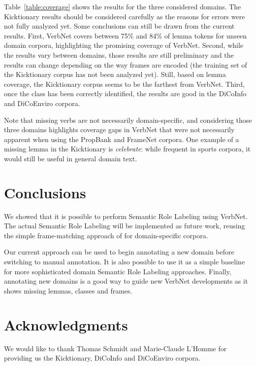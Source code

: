 Table~\ref{table:coverage} shows the results for the three considered domains.
The Kicktionary results should be considered carefully as the reasons for
errors were not fully analyzed yet. Some conclusions can still be drawn from
the current results. First, VerbNet covers between 75\% and 84\% of lemma
tokens for unseen domain corpora, highlighting the promising coverage of
VerbNet.  Second, while the results vary between domains, those results are
still preliminary and the results can change depending on the way frames are
encoded (the training set of the Kicktionary corpus has not been analyzed yet).
Still, based on lemma coverage, the Kicktionary corpus seems to be the farthest
from VerbNet. Third, once the class has been correctly identified, the results
are good in the DiCoInfo and DiCoEnviro corpora.

Note that missing verbs are not necessarily domain-specific, and considering
those three domains highlights coverage gaps in VerbNet that were not
necessarily apparent when using the PropBank and FrameNet corpora. One example
of a missing lemma in the Kicktionary is \textit{celebrate}: while frequent in
sports corpora, it would still be useful in general domain text.

\section{Conclusions}

We showed that it is possible to perform Semantic Role Labeling using VerbNet.
The actual Semantic Role Labeling will be implemented as future work, reusing
the simple frame-matching approach of \cite{swier2005exploiting} for
domain-specific corpora.

Our current approach can be used to begin annotating a new domain before
switching to manual annotation. It is also possible to use it as a simple
baseline for more sophisticated domain Semantic Role Labeling approaches.
Finally, annotating new domains is a good way to guide new VerbNet developments
as it shows missing lemmas, classes and frames.

\section*{Acknowledgments}

We would like to thank Thomas Schmidt and Marie-Claude L'Homme for providing
us the Kicktionary, DiCoInfo and DiCoEnviro corpora.
